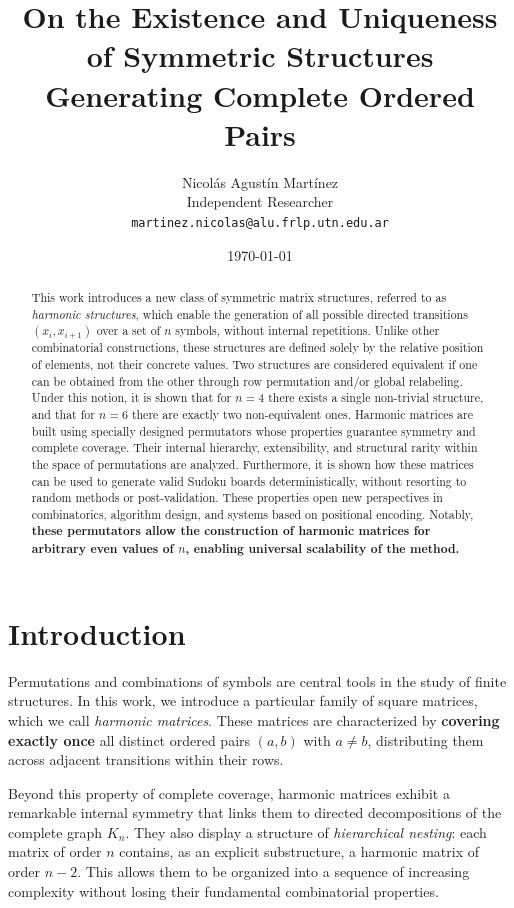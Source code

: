 \documentclass{article}
\title{On the Existence and Uniqueness of Symmetric Structures Generating Complete Ordered Pairs}
\author{Nicolás Agustín Martínez\\
\small Independent Researcher\\
\small \texttt{martinez.nicolas@alu.frlp.utn.edu.ar}}
\date{\today}
\begin{document}
\maketitle

\begin{abstract}
This work introduces a new class of symmetric matrix structures, referred to as \emph{harmonic structures}, which enable the generation of all possible directed transitions \((x_i, x_{i+1})\) over a set of \(n\) symbols, without internal repetitions. Unlike other combinatorial constructions, these structures are defined solely by the relative position of elements, not their concrete values. Two structures are considered equivalent if one can be obtained from the other through row permutation and/or global relabeling. Under this notion, it is shown that for \(n = 4\) there exists a single non-trivial structure, and that for \(n = 6\) there are exactly two non-equivalent ones. Harmonic matrices are built using specially designed permutators whose properties guarantee symmetry and complete coverage. Their internal hierarchy, extensibility, and structural rarity within the space of permutations are analyzed. Furthermore, it is shown how these matrices can be used to generate valid Sudoku boards deterministically, without resorting to random methods or post-validation. These properties open new perspectives in combinatorics, algorithm design, and systems based on positional encoding. Notably, \textbf{these permutators allow the construction of harmonic matrices for arbitrary even values of \(n\), enabling universal scalability of the method.}
\end{abstract}

\section{Introduction}

Permutations and combinations of symbols are central tools in the study of finite structures.  
In this work, we introduce a particular family of square matrices, which we call \emph{harmonic matrices}. These matrices are characterized by \textbf{covering exactly once} all distinct ordered pairs \((a,b)\) with \(a \neq b\), distributing them across adjacent transitions within their rows.

Beyond this property of complete coverage, harmonic matrices exhibit a remarkable internal symmetry that links them to directed decompositions of the complete graph \(K_n\). They also display a structure of \emph{hierarchical nesting}: each matrix of order \(n\) contains, as an explicit substructure, a harmonic matrix of order \(n-2\). This allows them to be organized into a sequence of increasing complexity without losing their fundamental combinatorial properties.
\end{document}
